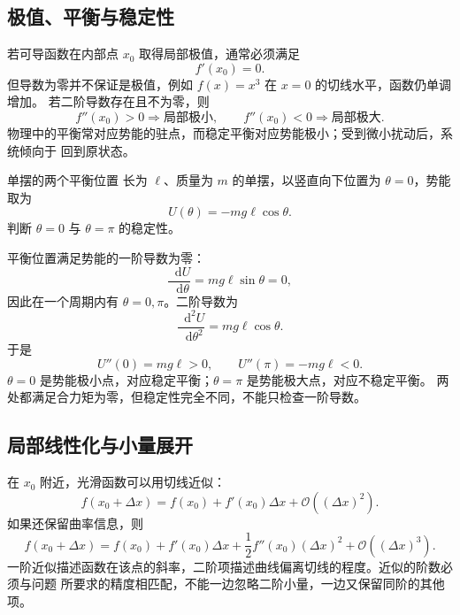\documentclass[UTF8,zihao=-4,oneside,openany]{ctexbook}
\numberwithin{equation}{section}
\newcommand{\dd}{\mathop{}\!\mathrm{d}}
\newcommand{\order}[1]{\mathcal O\!\left(#1\right)}
\begin{document}
\subsection{极值、平衡与稳定性}

若可导函数在内部点 $x_0$ 取得局部极值，通常必须满足
\begin{equation}
  f'(x_0)=0.
  \label{eq:stationary-condition}
\end{equation}
但导数为零并不保证是极值，例如 $f(x)=x^3$ 在 $x=0$ 的切线水平，函数仍单调增加。
若二阶导数存在且不为零，则
\begin{equation}
  f''(x_0)>0\Rightarrow\text{局部极小},
  \qquad
  f''(x_0)<0\Rightarrow\text{局部极大}.
  \label{eq:second-derivative-test}
\end{equation}
物理中的平衡常对应势能的驻点，而稳定平衡对应势能极小；受到微小扰动后，系统倾向于
回到原状态。

\begin{examplebox}{单摆的两个平衡位置}
长为 $\ell$、质量为 $m$ 的单摆，以竖直向下位置为 $\theta=0$，势能取为
\[
  U(\theta)=-mg\ell\cos\theta.
\]
判断 $\theta=0$ 与 $\theta=\pi$ 的稳定性。

\tcblower
平衡位置满足势能的一阶导数为零：
\[
  \frac{\dd U}{\dd\theta}=mg\ell\sin\theta=0,
\]
因此在一个周期内有 $\theta=0,\pi$。二阶导数为
\[
  \frac{\dd^2U}{\dd\theta^2}=mg\ell\cos\theta.
\]
于是
\[
  U''(0)=mg\ell>0,
  \qquad
  U''(\pi)=-mg\ell<0.
\]
$\theta=0$ 是势能极小点，对应稳定平衡；$\theta=\pi$ 是势能极大点，对应不稳定平衡。
两处都满足合力矩为零，但稳定性完全不同，不能只检查一阶导数。
\end{examplebox}

\subsection{局部线性化与小量展开}

在 $x_0$ 附近，光滑函数可以用切线近似：
\begin{equation}
  f(x_0+\Delta x)
  =f(x_0)+f'(x_0)\Delta x+\order{(\Delta x)^2}.
  \label{eq:first-order-taylor}
\end{equation}
如果还保留曲率信息，则
\begin{equation}
  f(x_0+\Delta x)
  =f(x_0)+f'(x_0)\Delta x
  +\frac12f''(x_0)(\Delta x)^2+\order{(\Delta x)^3}.
  \label{eq:second-order-taylor}
\end{equation}
一阶近似描述函数在该点的斜率，二阶项描述曲线偏离切线的程度。近似的阶数必须与问题
所要求的精度相匹配，不能一边忽略二阶小量，一边又保留同阶的其他项。
\end{document}
